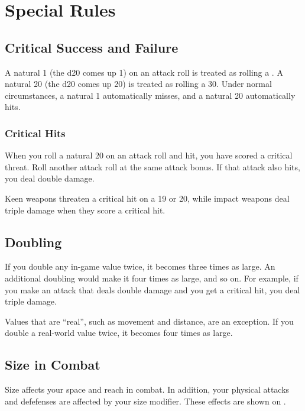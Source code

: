 \section{Special Rules}\label{Special Rules}

\subsection{Critical Success and Failure}\label{Critical Success and Failure}
A natural 1 (the d20 comes up 1) on an attack roll is treated as rolling a . A natural 20 (the d20 comes up 20) is treated as rolling a 30. Under normal circumstances, a natural 1 automatically misses, and a natural 20 automatically hits.

\subsubsection{Critical Hits}\label{Critical Hits}
When you roll a natural 20 on an attack roll and hit, you have scored a critical threat. Roll another attack roll at the same attack bonus. If that attack also hits, you deal double damage.

Keen weapons threaten a critical hit on a 19 or 20, while impact weapons deal triple damage when they score a critical hit.

\subsection{Doubling}\label{Doubling}
If you double any in-game value twice, it becomes three times as large. An additional doubling would make it four times as large, and so on. For example, if you make an attack that deals double damage and you get a critical hit, you deal triple damage.

 Values that are ``real'', such as movement and distance, are an exception. If you double a real-world value twice, it becomes four times as large. 

\subsection{Size in Combat}\label{Size in Combat}
Size affects your space and reach in combat. In addition, your physical attacks and defefenses are affected by your size modifier. These effects are shown on . 

